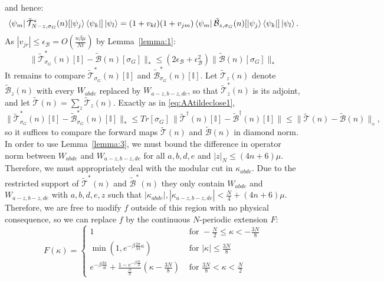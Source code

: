 and hence:
\begin{equation}
    \bra{\psi_m}\tilde{\mathcal{T}}^*_{N -z,\sigma_G}(n)[\ket{\psi_j}\bra{\psi_k}]\ket{\psi_l}
    =(1+v_{kl})(1+v_{jm})\bra{\psi_m}\tilde{\mathcal{B}}_{z,\sigma_G}(n)[\ket{\psi_j}\bra{\psi_k}]\ket{\psi_l}.
\end{equation}
As $|v_{jr}| \leq \epsilon_{\mathcal{B}} = O(\frac{n\beta \mu}{Nt})$ by Lemma~\ref{lemma:1}:
\begin{equation}
    \|\tilde{\mathcal{T}}^*_{\sigma_G}(n)[\mathbb{I}] - \tilde{\mathcal{B}}(n)[\sigma_G]\|_* \leq (2\epsilon_{\mathcal{B}} + \epsilon_{\mathcal{B}}^2)\|\tilde{\mathcal{B}}(n)[\sigma_G]\|_*
    \label{eq:Boutput}
\end{equation}
It remains to compare $\tilde{\mathcal{T}}^*_{\sigma_G}(n)[\mathbb{I}]$ and $\tilde{\mathcal{B}}^*_{\sigma_G}(n)[\mathbb{I}]$. Let $\tilde{\mathcal{T}}_z(n)$ denote $\tilde{\mathcal{B}}_z(n)$ with every $W_{abde}$ replaced by $W_{a-z,b-z,de}$, so that $\tilde{\mathcal{T}}^*_z(n)$ is its adjoint, and let $\tilde{\mathcal{T}}(n)=\sum_z\tilde{\mathcal{T}}_z(n)$. Exactly as in \eqref{eq:AAtildeclose1},
\begin{equation}
    \|\tilde{\mathcal{T}}^*_{\sigma_G}(n)[\mathbb{I}]-\tilde{\mathcal{B}}^*_{\sigma_G}(n)[\mathbb{I}]\|_*\leq Tr[\sigma_G]\,\|\tilde{\mathcal{T}}^{\dagger}(n)[\mathbb{I}]-\tilde{\mathcal{B}}^{\dagger}(n)[\mathbb{I}]\|\leq\|\tilde{\mathcal{T}}(n)-\tilde{\mathcal{B}}(n)\|_{\diamond},
    \label{eq:TBduality}
\end{equation}
so it suffices to compare the forward maps $\tilde{\mathcal{T}}(n)$ and $\tilde{\mathcal{B}}(n)$ in diamond norm. In order to use Lemma~\ref{lemma:3}, we must bound the difference in operator norm between $W_{abde}$ and $W_{a-z,b-z,de}$ for all $a,b,d,e$ and $|z|_{N} \leq (4n+6)\mu$. Therefore, we must appropriately deal with the modular cut in $\kappa_{abde}$. Due to the restricted support of $\tilde{\mathcal{T}}^*(n)$ and $\tilde{\mathcal{B}}^*(n)$ they only contain $W_{abde}$ and $W_{a-z,b-z,de}$ with $a,b,d,e, z$ such that $|\kappa_{abde}|,|\kappa_{a-z,b-z,de}| < \frac{N}{4}+(4n+6)\mu$. Therefore, we are free to modify $f$ outside of this region with no physical consequence, so we can replace $f$ by the continuous $N$-periodic extension $F$:
\begin{equation}
    F(\kappa) = \begin{cases}1& \text{ for }  -\frac{N}{2} \leq \kappa <  - \frac{3N}{8}\\
        \min(1,e^{-\beta \frac{2\pi}{Nt} \kappa}) & \text{ for } |\kappa|\leq \frac{3N}{8}\\
        e^{-\beta\frac{3\pi}{4t}} + \frac{1- e^{-\beta\frac{3\pi}{4t}}}{\frac{N}{8}}(\kappa -  \frac{3N}{8}) & \text{ for }  \frac{3N}{8} < \kappa <  \frac{N}{2}
    \end{cases}
\end{equation}
